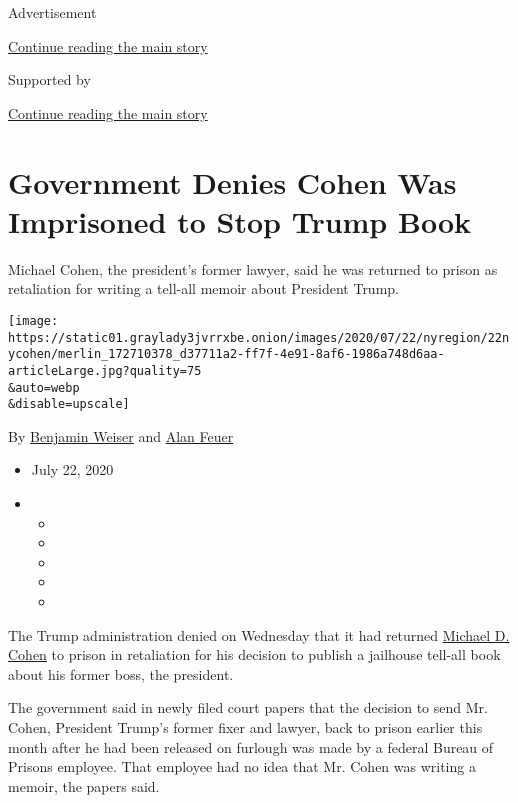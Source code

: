 Advertisement

\protect\hyperlink{after-top}{Continue reading the main story}

Supported by

\protect\hyperlink{after-sponsor}{Continue reading the main story}

\hypertarget{government-denies-cohen-was-imprisoned-to-stop-trump-book}{%
\section{Government Denies Cohen Was Imprisoned to Stop Trump
Book}\label{government-denies-cohen-was-imprisoned-to-stop-trump-book}}

Michael Cohen, the president's former lawyer, said he was returned to
prison as retaliation for writing a tell-all memoir about President
Trump.

\texttt{[image: https://static01.graylady3jvrrxbe.onion/images/2020/07/22/nyregion/22nycohen/merlin\_172710378\_d37711a2-ff7f-4e91-8af6-1986a748d6aa-articleLarge.jpg?quality=75\\\&auto=webp\\\&disable=upscale]}

By \href{https://www.nytimes3xbfgragh.onion/by/benjamin-weiser}{Benjamin
Weiser} and \href{https://www.nytimes3xbfgragh.onion/by/alan-feuer}{Alan
Feuer}

\begin{itemize}
\item
  July 22, 2020
\item
  \begin{itemize}
  \item
  \item
  \item
  \item
  \item
  \end{itemize}
\end{itemize}

The Trump administration denied on Wednesday that it had returned
\href{https://www.nytimes3xbfgragh.onion/2020/07/23/nyregion/michael-cohen-trump-book.html}{Michael
D. Cohen} to prison in retaliation for his decision to publish a
jailhouse tell-all book about his former boss, the president.

The government said in newly filed court papers that the decision to
send Mr. Cohen, President Trump's former fixer and lawyer, back to
prison earlier this month after he had been released on furlough was
made by a federal Bureau of Prisons employee. That employee had no idea
that Mr. Cohen was writing a memoir, the papers said.

